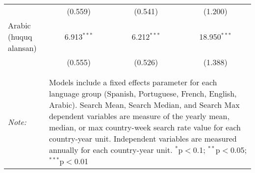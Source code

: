 \begin{table}[!htbp]
\begin{tabular}{@{\extracolsep{5pt}}lccc}
  & (0.559) & (0.541) & (1.200) \\ 
  Arabic (huquq alansan) & 6.913$^{***}$ & 6.212$^{***}$ & 18.950$^{***}$ \\ 
  & (0.555) & (0.526) & (1.388) \\ 
 \hline \\[-1.8ex] 
\hline 
\hline \\[-1.8ex] 
\textit{Note:}  & \multicolumn{3}{l}{\parbox[t]{8cm}{Models include a fixed effects parameter for each language group (Spanish, Portuguese, French, English, Arabic). Search Mean, Search Median, and Search Max dependent variables are measure of the yearly mean, median, or max country-week search rate value for each country-year unit. Independent variables are measured annually for each country-year unit. $^{*}$p$<$0.1; $^{**}$p$<$0.05; $^{***}$p$<$0.01}} \\ 
\end{tabular} 
\end{table} 
